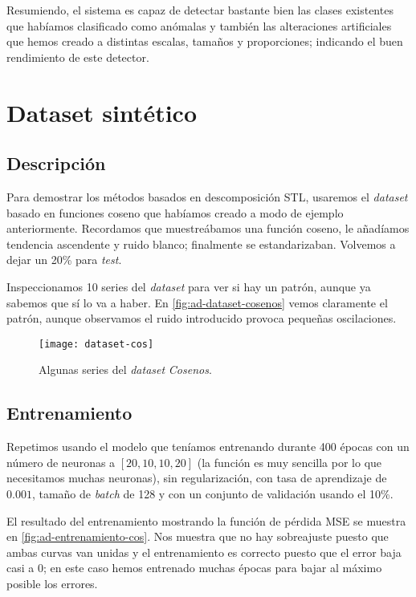 Resumiendo, el sistema es capaz de detectar bastante bien las clases existentes que habíamos clasificado como anómalas y también las alteraciones artificiales que hemos creado a distintas escalas, tamaños y proporciones; indicando el buen rendimiento de este detector.

\section{Dataset sintético}

\subsection{Descripción}

Para demostrar los métodos basados en descomposición STL, usaremos el \emph{dataset} basado en funciones coseno que habíamos creado a modo de ejemplo anteriormente. Recordamos que muestreábamos una función coseno, le añadíamos tendencia ascendente y ruido blanco; finalmente se estandarizaban. Volvemos a dejar un 20\% para \emph{test}.

Inspeccionamos 10 series del \emph{dataset}  para ver si hay un patrón, aunque ya sabemos que sí lo va a haber. En \autoref{fig:ad-dataset-cosenos} vemos claramente el patrón, aunque observamos el ruido introducido provoca pequeñas oscilaciones.

\begin{figure}[htpb]
  \centering
  \texttt{[image: dataset-cos]}
  \caption{Algunas series del \emph{dataset} \emph{Cosenos}.}
  \label{fig:ad-dataset-cosenos}
\end{figure}

\subsection{Entrenamiento}

Repetimos usando el modelo que teníamos entrenando durante 400 épocas con un número de neuronas a $[20, 10, 10, 20]$ (la función es muy sencilla por lo que necesitamos muchas neuronas), sin regularización, con tasa de aprendizaje de $0.001$, tamaño de \emph{batch} de 128 y con un conjunto de validación usando el 10\%.

El resultado del entrenamiento mostrando la función de pérdida MSE se muestra en \autoref{fig:ad-entrenamiento-cos}. Nos muestra que no hay sobreajuste puesto que ambas curvas van unidas y el entrenamiento es correcto puesto que el error baja casi a 0; en este caso hemos entrenado muchas épocas para bajar al máximo posible los errores.

